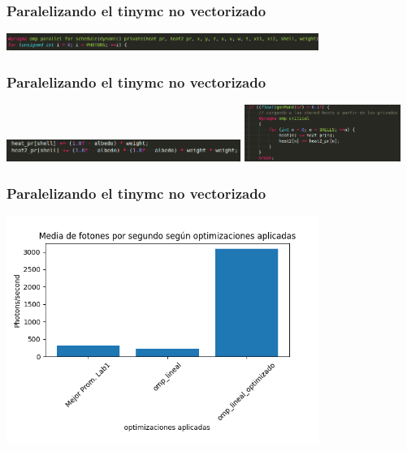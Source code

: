 \documentclass{beamer}
\begin{document}
    \begin{frame}
        \frametitle{Paralelizando el tinymc no vectorizado}
        \includegraphics[width=4in]{imagenes/opt_omp_lin_3.png}

    \end{frame}

    \begin{frame}
        \frametitle{Paralelizando el tinymc no vectorizado}

        \includegraphics[width=3in]{imagenes/opt_omp_lin_4.png} \pause
        \includegraphics[width=2in]{imagenes/opt_omp_lin_5.png}

    \end{frame}

    \begin{frame}
        \frametitle{Paralelizando el tinymc no vectorizado}
        \includegraphics[width=4in]{imagenes/comp_prom_2.png}
    \end{frame}
\end{document}
